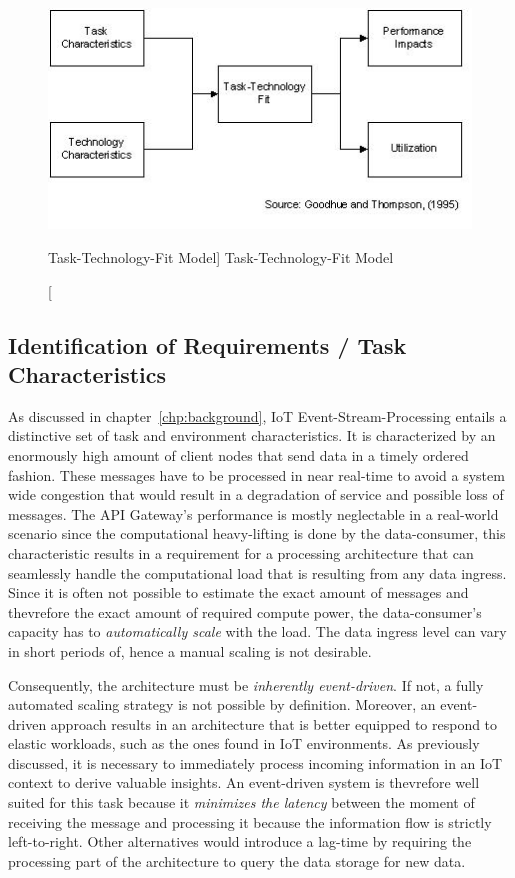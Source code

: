 \begin{figure}[ht]
    \includegraphics[width=0.7\linewidth]{images/methodology/ttf.jpg}\centering
    \caption
    [Task-Technology-Fit Model]
    {Task-Technology-Fit Model \cite{Goodhue1995Task-TechnologyPerformance}}
\end{figure}

\subsection{Identification of Requirements / Task Characteristics}

As discussed in chapter~\vref{chp:background}, IoT Event-Stream-Processing entails a distinctive set of task and environment characteristics. It is characterized by an enormously high amount of client nodes that send data in a timely ordered fashion. These messages have to be processed in near real-time to avoid a system wide congestion that would result in a degradation of service and possible loss of messages. The API Gateway's performance is mostly neglectable in a real-world scenario since the computational heavy-lifting is done by the data-consumer, this characteristic results in a requirement for a processing architecture that can seamlessly handle the computational load that is resulting from any data ingress.\\
Since it is often not possible to estimate the exact amount of messages and thevrefore the exact amount of required compute power, the data-consumer's capacity has to \textit{automatically scale} with the load. The data ingress level can vary in short periods of, hence a manual scaling is not desirable.

Consequently, the architecture must be \textit{inherently event-driven}. If not, a fully automated scaling strategy is not possible by definition. Moreover, an event-driven approach results in an architecture that is better equipped to respond to elastic workloads, such as the ones found in IoT environments. As previously discussed, it is necessary to immediately process incoming information in an IoT context to derive valuable insights. An event-driven system is thevrefore well suited for this task because it \textit{minimizes the latency} between the moment of receiving the message and processing it because the information flow is strictly left-to-right. Other alternatives would introduce a lag-time by requiring the processing part of the architecture to query the data storage for new data. 

